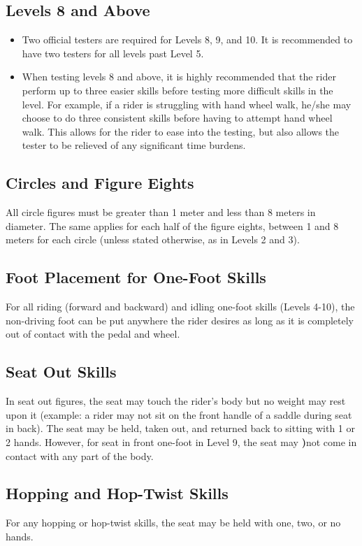 \subsection{Levels 8 and Above}
\begin{itemize}
\item Two official testers are required for Levels 8, 9, and 10.
It is recommended to have two testers for all levels past Level 5.
\item When testing levels 8 and above, it is highly recommended that the rider perform up to three easier skills before testing more difficult skills in the level.
For example, if a rider is struggling with hand wheel walk, he/she may choose to do three consistent skills before having to attempt hand wheel walk.
This allows for the rider to ease into the testing, but also allows the tester to be relieved of any significant time burdens.
\end{itemize}

\subsection{Circles and Figure Eights}
All circle figures must be greater than 1 meter and less than 8 meters in diameter.
The same applies for each half of the figure eights, between 1 and 8 meters for each circle (unless stated otherwise, as in Levels 2 and 3).

\subsection{Foot Placement for One-Foot Skills}
For all riding (forward and backward) and idling one-foot skills (Levels 4-10), the non-driving foot can be put anywhere the rider desires as long as it is completely out of contact with the pedal and wheel.

\subsection{Seat Out Skills}
In seat out figures, the seat may touch the rider's body but no weight may rest upon it (example: a rider may not sit on the front handle of a saddle during seat in back).
The seat may be held, taken out, and returned back to sitting with 1 or
2 hands.
However, for seat in front one-foot in Level 9, the seat may \textbf){not} come in contact with any part of the body.

\subsection{Hopping and Hop-Twist Skills}
For any hopping or hop-twist skills, the seat may be held with one, two, or no hands.

